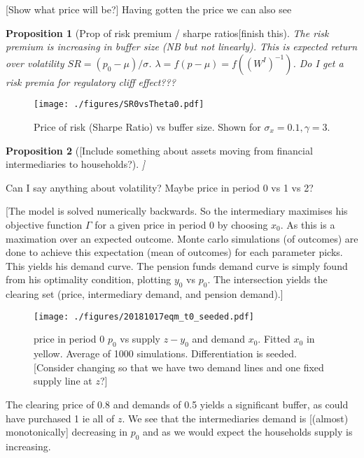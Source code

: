 \documentclass[11pt]{article}
\newtheorem{proposition}{Proposition}
\begin{document}
[Show what price will be?] Having gotten the price we can also see

\begin{proposition}[Prop of risk premium / sharpe ratios[finish this]
The risk premium is increasing in buffer size (NB but not linearly).
This is expected return over volatility $SR = (p_0 - \mu)/ \sigma$. $\lambda = f(p-\mu) = f((W^I)^{-1})$. Do I get a risk premia for regulatory cliff effect???
\end{proposition}

\begin{figure}[h]
\centering
\texttt{[image: ./figures/SR0vsTheta0.pdf]}
\caption{Price of risk (Sharpe Ratio) vs buffer size. Shown for $\sigma_x = 0.1, \gamma = 3$. }
\label{f_probSRvsBuffer}
\end{figure}


\begin{proposition}[[Include something about assets moving from financial intermediaries to households?]]

\end{proposition}

Can I say anything about volatility? Maybe price in period 0 vs 1 vs 2?

[The model is solved numerically backwards. So the intermediary maximises his objective function $\Gamma$ for a given price in period 0 by choosing $x_0$. As this is a maximation over an expected outcome. Monte carlo simulations (of outcomes) are done to achieve this expectation (mean of outcomes) for each parameter picks. This yields his demand curve. The pension funds demand curve is simply found from his optimality condition, plotting $y_0$ vs $p_0$. The intersection yields the clearing set (price, intermediary demand, and pension demand).]

\begin{figure}[h]
\centering
\texttt{[image: ./figures/20181017eqm\_t0\_seeded.pdf]}
\caption{price in period 0 $p_0$ vs supply $z-y_0$ and demand $x_0$. Fitted $x_0$ in yellow. Average of 1000 simulations. Differentiation is seeded. [Consider changing so that we have two demand lines and one fixed supply line at $z$?]}
\end{figure}

The clearing price of 0.8 and demands of 0.5 yields a significant buffer, as could have purchased 1 ie all of $z$.  We see that the intermediaries demand is [(almost) monotonically] decreasing in $p_0$ and as we would expect the households supply is increasing.
\end{document}
